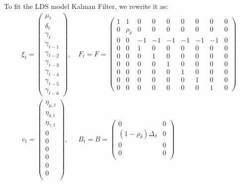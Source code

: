 \documentclass[12pt]{article}
\numberwithin{equation}{section}
\begin{document}
To fit the LDS model Kalman Filter, we rewrite it as:
\begin{align*}
    \xi_t = \begin{pmatrix}
        \mu_t \\
        \delta_t \\
        \gamma_t \\
        \gamma_{t-1} \\
        \gamma_{t-2} \\
        \gamma_{t-3} \\
        \gamma_{t-4} \\
        \gamma_{t-5} \\
        \gamma_{t-6}
    \end{pmatrix}, 
    &\ 
    F_t = F = \begin{pmatrix}
        1 & 1  & 0 & 0 & 0 & 0 & 0 & 0 & 0 \\
        0 & \rho_{\delta}  & 0 & 0 & 0 & 0 & 0 & 0 & 0 \\
        0 & 0 & -1 & -1 & -1 & -1 & -1 & -1 & 0 \\
        0 & 0 & 1 & 0 & 0 & 0 & 0 & 0 & 0 \\
        0 & 0 & 0 & 1 & 0 & 0 & 0 & 0 & 0 \\
        0 & 0 & 0 & 0 & 1 & 0 & 0 & 0 & 0 \\
        0 & 0 & 0 & 0 & 0 & 1 & 0 & 0 & 0 \\
        0 & 0 & 0 & 0 & 0 & 0 & 1 & 0 & 0 \\
        0 & 0 & 0 & 0 & 0 & 0 & 0 & 1 & 0
    \end{pmatrix} \\
    v_t = \begin{pmatrix}
        \eta_{\mu,t} \\
        \eta_{\delta,t} \\
        \eta_{\gamma,t} \\
        0 \\
        0 \\
        0 \\
        0 \\
        0 \\
        0 \\
    \end{pmatrix},
    &\ 
    B_t = B = \begin{pmatrix}
        0 & 0 \\
        (1-\rho_{\delta})\Delta_{\delta} & 0 \\
        0 & 0 \\
        0 & 0 \\

\end{pmatrix}
\end{align*}
\end{document}
